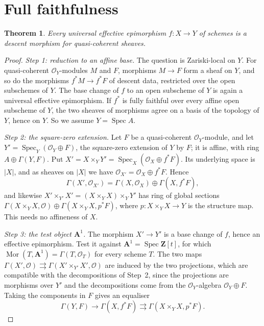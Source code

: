 \documentclass[11pt,a4paper]{amsart}
\newtheorem{theorem}{Theorem}[section]
\theoremstyle{definition}
\theoremstyle{remark}
\newcommand{\Z}{\mathbf Z}
\newcommand{\Spec}{\operatorname{Spec}}
\newcommand{\Mor}{\operatorname{Mor}}
\begin{document}
\section{Full faithfulness}\label{sec:A}

\begin{theorem}\label{t:A}
Every universal effective epimorphism $f\colon X\to Y$ of schemes is a descent morphism for quasi-coherent sheaves.
\end{theorem}

\begin{proof}
\emph{Step 1: reduction to an affine base.} The question is Zariski-local on $Y$. For quasi-coherent $\mathcal O_Y$-modules $M$ and $F$, morphisms $M\to F$ form a sheaf on $Y$, and so do the morphisms $f^*M\to f^*F$ of descent data, restricted over the open subschemes of $Y$. The base change of $f$ to an open subscheme of $Y$ is again a universal effective epimorphism. If $f^*$ is fully faithful over every affine open subscheme of $Y$, the two sheaves of morphisms agree on a basis of the topology of $Y$, hence on $Y$. So we assume $Y=\Spec A$.

\emph{Step 2: the square-zero extension.} Let $F$ be a quasi-coherent $\mathcal O_Y$-module, and let $Y'=\Spec_Y(\mathcal O_Y\oplus F)$, the square-zero extension of $Y$ by $F$; it is affine, with ring $A\oplus\Gamma(Y,F)$. Put $X'=X\times_YY'=\Spec_X(\mathcal O_X\oplus f^*F)$. Its underlying space is $|X|$, and as sheaves on $|X|$ we have $\mathcal O_{X'}=\mathcal O_X\oplus f^*F$. Hence
\[
\Gamma(X',\mathcal O_{X'})=\Gamma(X,\mathcal O_X)\oplus\Gamma(X,f^*F),
\]
and likewise $X'\times_{Y'}X'=(X\times_YX)\times_YY'$ has ring of global sections $\Gamma(X\times_YX,\mathcal O)\oplus\Gamma(X\times_YX,p^*F)$, where $p\colon X\times_YX\to Y$ is the structure map. This needs no affineness of $X$.

\emph{Step 3: the test object $\mathbf A^1$.} The morphism $X'\to Y'$ is a base change of $f$, hence an effective epimorphism. Test it against $\mathbf A^1=\Spec\Z[t]$, for which $\Mor(T,\mathbf A^1)=\Gamma(T,\mathcal O_T)$ for every scheme $T$. The two maps $\Gamma(X',\mathcal O)\rightrightarrows\Gamma(X'\times_{Y'}X',\mathcal O)$ are induced by the two projections, which are compatible with the decompositions of Step~2, since the projections are morphisms over $Y'$ and the decompositions come from the $\mathcal O_Y$-algebra $\mathcal O_Y\oplus F$. Taking the components in $F$ gives an equaliser
\[
\Gamma(Y,F)\to\Gamma(X,f^*F)\rightrightarrows\Gamma(X\times_YX,p^*F).
\]


\end{proof}
\end{document}
